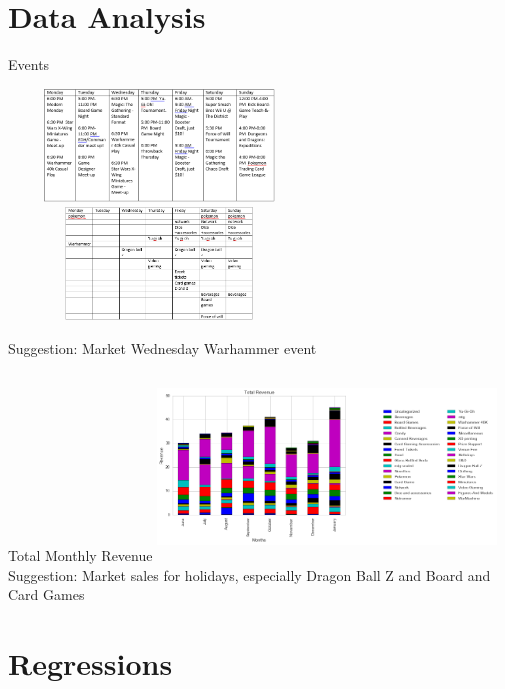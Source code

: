 \documentclass[compress,blue]{beamer}
\begin{document}
\section{Data Analysis}

\begin{frame}{Events}
\vspace{0cm}
\begin{rows}
\row{\textwidth}
\includegraphics[width=8cm,height=3cm]{DistrictCompanyEventSchedule}
\row{\textwidth}
\includegraphics[width=8cm,height=3cm]{MegansFindings}
\end{rows}
\newline
Suggestion: Market Wednesday Warhammer event
\end{frame}

\begin{frame}{Total Monthly Revenue}
\vspace{0cm}
\includegraphics[width=9cm,height=5cm]{TotalMonthlyRevenue}
\newline
Suggestion: Market sales for holidays, especially Dragon Ball Z and Board and
Card Games
\end{frame}


\section{Regressions}
\end{document}
